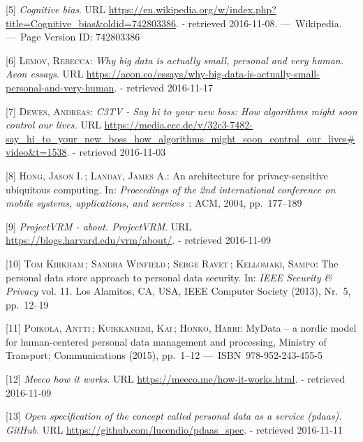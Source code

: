 \documentclass[12pt,english,a4paper,titlepage,cleardoublepage=empty,dottedtoc]{report}
\begin{document}
\hypertarget{ref-wikipedia_2016_cognitive-bias}{}
{[}5{]} \emph{Cognitive bias}. URL
\url{https://en.wikipedia.org/w/index.php?title=Cognitive_bias\&oldid=742803386}.
- retrieved 2016-11-08. ---~Wikipedia. ---~Page Version ID: 742803386

\hypertarget{ref-web_2016_big-data-is-people}{}
{[}6{]} \textsc{Lemov, Rebecca}: \emph{Why big data is actually small,
personal and very human. Aeon essays}. URL
\url{https://aeon.co/essays/why-big-data-is-actually-small-personal-and-very-human}.
- retrieved 2016-11-17

\hypertarget{ref-video_2015_big-data-and-deep-learning_discrimination}{}
{[}7{]} \textsc{Dewes, Andreas}: \emph{C3TV - Say hi to your new boss:
How algorithms might soon control our lives.} URL
\url{https://media.ccc.de/v/32c3-7482-say_hi_to_your_new_boss_how_algorithms_might_soon_control_our_lives\#video\&t=1538}.
- retrieved 2016-11-03

\hypertarget{ref-study_2004_architecture-for-privacy-sensitive-ubiquitous-computing}{}
{[}8{]} \textsc{Hong, Jason I.}\,; \textsc{Landay, James A.}: An
architecture for privacy-sensitive ubiquitous computing. In:
\emph{Proceedings of the 2nd international conference on mobile systems,
applications, and services}~: ACM, 2004, pp.~177--189

\hypertarget{ref-web_2010_projectvrm_about}{}
{[}9{]} \emph{ProjectVRM - about. ProjectVRM}. URL
\url{https://blogs.harvard.edu/vrm/about/}. - retrieved 2016-11-09

\hypertarget{ref-paper_2013_the-personal-data-store-approach-to-personal-data-security_2013}{}
{[}10{]} \textsc{Tom Kirkham}\,; \textsc{Sandra Winfield}\,;
\textsc{Serge Ravet}\,; \textsc{Kellomaki, Sampo}: The personal data
store approach to personal data security. In: \emph{IEEE Security \&
Privacy} vol. 11. Los Alamitos, CA, USA, IEEE Computer Society (2013),
Nr.~5, pp.~12--19

\hypertarget{ref-whitepaper_2014_mydata-a-nordic-model-for-human-centered-personal-data-management-and-processing}{}
{[}11{]} \textsc{Poikola, Antti}\,; \textsc{Kuikkaniemi, Kai}\,;
\textsc{Honko, Harri}: MyData -- a nordic model for human-centered
personal data management and processing, Ministry of Transport;
Communications (2015), pp.~1--12 ---~ISBN~978-952-243-455-5

\hypertarget{ref-web_2016_meeco-how-it-works}{}
{[}12{]} \emph{Meeco how it works}. URL
\url{https://meeco.me/how-it-works.html}. - retrieved 2016-11-09

\hypertarget{ref-repo_2016_pdaas-spec}{}
{[}13{]} \emph{Open specification of the concept called personal data as
a service (pdaas). GitHub}. URL
\url{https://github.com/lucendio/pdaas_spec}. - retrieved 2016-11-11
\end{document}
